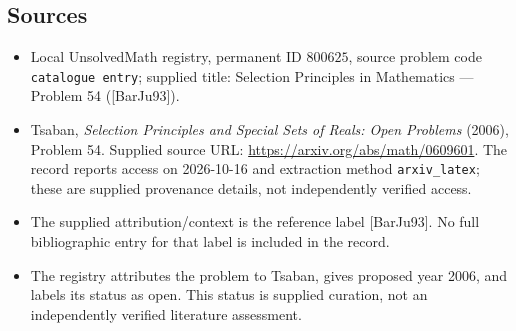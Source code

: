 \documentclass[11pt]{article}
\begin{document}
\subsection{Sources}
\begin{itemize}
\item Local UnsolvedMath registry, permanent ID \(800625\), source problem code \texttt{catalogue entry}; supplied title: Selection Principles in Mathematics --- Problem 54 ([BarJu93]).
\item Tsaban, \emph{Selection Principles and Special Sets of Reals: Open Problems} (2006), Problem 54. Supplied source URL: \url{https://arxiv.org/abs/math/0609601}. The record reports access on 2026-10-16 and extraction method \texttt{arxiv\_latex}; these are supplied provenance details, not independently verified access.
\item The supplied attribution/context is the reference label [BarJu93]. No full bibliographic entry for that label is included in the record.
\item The registry attributes the problem to Tsaban, gives proposed year 2006, and labels its status as open. This status is supplied curation, not an independently verified literature assessment.
\end{itemize}
\end{document}
